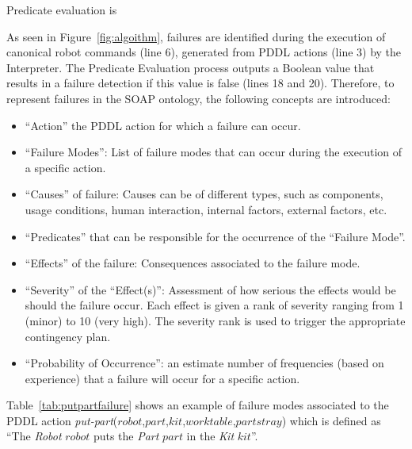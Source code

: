 \documentclass{llncs}
\begin{document}
Predicate evaluation is 

As seen in Figure~\ref{fig:algoithm}, failures are identified during the execution of canonical robot commands (line 6), generated from PDDL actions (line 3) by the Interpreter. The Predicate Evaluation process outputs a Boolean value that results in a failure detection if this value is false (lines 18 and 20). Therefore, to represent failures in the SOAP ontology, the following concepts are introduced:
\begin{itemize}
 \item ``Action'' the PDDL action for which a failure can occur.
 \item ``Failure Modes'': List of failure modes that can occur during the execution of a specific action.
 \item ``Causes'' of failure: Causes can be of different types, such as  components, usage conditions, human interaction, internal factors, external factors, etc.
 \item ``Predicates'' that can be responsible for the occurrence of the ``Failure Mode''.
 \item ``Effects'' of the failure: Consequences associated to the failure mode.
 \item ``Severity'' of the ``Effect(s)'': Assessment of how serious the effects would be should the failure occur. Each effect is given a rank of severity ranging from 1 (minor) to 10 (very high). The severity rank is used to trigger the appropriate contingency plan.
 \item ``Probability of Occurrence'': an estimate number of frequencies (based on experience) that a failure will occur for a specific action.
\end{itemize}

Table~\ref{tab:putpartfailure} shows an example of failure modes associated to the PDDL action \textsl{put-part}($\mathit{robot}$,$\mathit{part}$,$\mathit{kit}$,$\mathit{worktable}$,$\mathit{partstray}$) which is defined as ``The \textit{Robot} $\mathit{robot}$ puts the \textit{Part} $\mathit{part}$ in the \textit{Kit} $\mathit{kit}$''.
\end{document}
